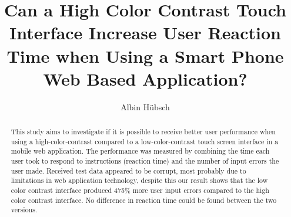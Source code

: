 \documentclass[runningheads,a4paper]{llncs}
\begin{document}
\pagestyle{headings}

\mainmatter


\title{Can a High Color Contrast Touch Interface Increase User Reaction Time when Using a Smart Phone Web Based Application?}





\author{Albin Hübsch}


\maketitle

%
\begin{abstract}
This study aims to investigate if it is possible to receive better user performance when using a high-color-contrast compared to a low-color-contrast touch screen interface in a mobile web application. The performance was measured by combining the time each user took to respond to instructions (reaction time) and the number of input errors the user made. Received test data appeared to be corrupt, most probably due to limitations in web application technology, despite this our result shows that the low color contrast interface produced 475\% more user input errors compared to the high color contrast interface. No difference in reaction time could be found between the two versions.
\end{abstract}
%
%
\end{document}
